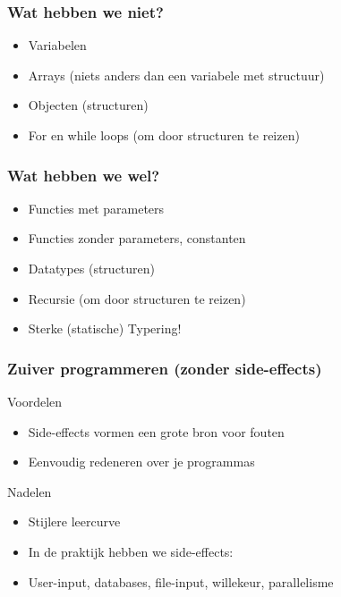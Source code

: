 \documentclass{beamer}
\begin{document}
\begin{frame}
    \frametitle{Wat hebben we niet?}
    \begin{itemize}
        \item Variabelen
        \item Arrays (niets anders dan een variabele met structuur)
        \item Objecten (structuren)
        \item For en while loops (om door structuren te reizen)
    \end{itemize}
\end{frame}

\begin{frame}
    \frametitle{Wat hebben we wel?}
    \begin{itemize}
        \item Functies met parameters
        \item Functies zonder parameters, constanten
        \item Datatypes (structuren)
        \item Recursie (om door structuren te reizen)
        \item Sterke (statische) Typering!
    \end{itemize}
\end{frame}

\begin{frame}
    \frametitle{Zuiver programmeren (zonder side-effects)}
    \begin{block}{Voordelen}
        \begin{itemize}
            \item Side-effects vormen een grote bron voor fouten
            \item Eenvoudig redeneren over je programmas
        \end{itemize}
    \end{block}
    \begin{block}{Nadelen}
        \begin{itemize}
            \item Stijlere leercurve
            \item In de praktijk hebben we side-effects:
            \item User-input, databases, file-input, willekeur, parallelisme
        \end{itemize}
    \end{block}
\end{frame}
\end{document}
